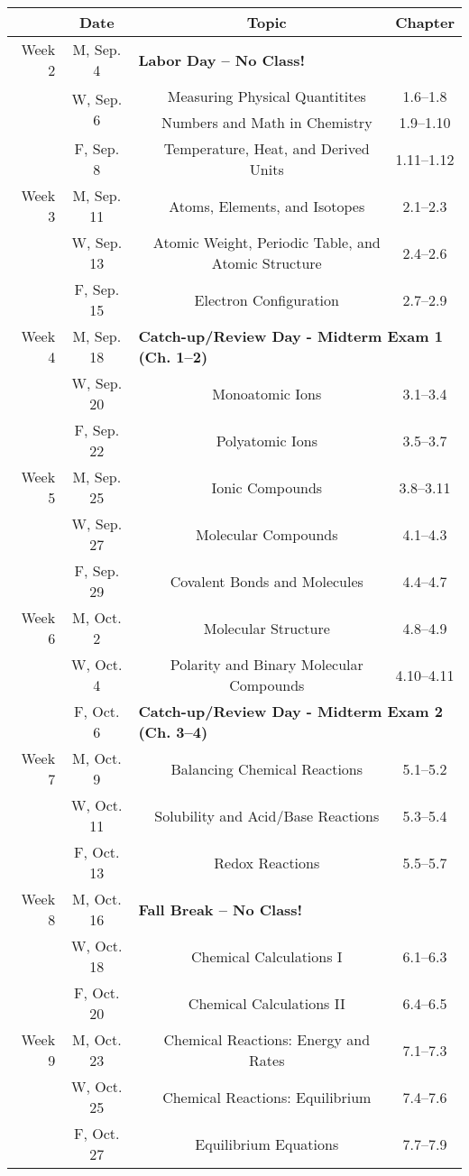 \documentclass[12pt, letterpaper]{article}
\begin{document}
\noindent
\begin{tabular}{rcccc}
& Date && Topic & Chapter\\
\midrule
Week 2 & M, Sep. 4& \multicolumn{3}{l}{\textbf{Labor Day -- No Class!}}\\
& \multirow{2}{*}{W, Sep. 6}& & Measuring Physical Quantitites & 1.6--1.8\\
& & & Numbers and Math in Chemistry & 1.9--1.10\\
& F, Sep. 8&& Temperature, Heat, and Derived Units & 1.11--1.12\\
\midrule
Week 3 & M, Sep. 11&& Atoms, Elements, and Isotopes & 2.1--2.3\\
& W, Sep. 13&& Atomic Weight, Periodic Table, and Atomic Structure & 2.4--2.6\\
& F, Sep. 15&& Electron Configuration & 2.7--2.9\\
\midrule
Week 4 & M, Sep. 18& \multicolumn{3}{l}{\textbf{Catch-up/Review Day - Midterm Exam 1 (Ch. 1--2)}}\\
& W, Sep. 20&& Monoatomic Ions & 3.1--3.4\\
& F, Sep. 22&& Polyatomic Ions & 3.5--3.7\\
\midrule
Week 5 & M, Sep. 25&& Ionic Compounds & 3.8--3.11\\
& W, Sep. 27&& Molecular Compounds & 4.1--4.3\\
& F, Sep. 29&& Covalent Bonds and Molecules & 4.4--4.7\\
\midrule
Week 6 & M, Oct. 2&& Molecular Structure & 4.8--4.9\\
& W, Oct. 4&& Polarity and Binary Molecular Compounds & 4.10--4.11\\
& F, Oct. 6& \multicolumn{3}{l}{\textbf{Catch-up/Review Day - Midterm Exam 2 (Ch. 3--4)}}\\
\midrule
Week 7 & M, Oct. 9&& Balancing Chemical Reactions & 5.1--5.2\\
& W, Oct. 11&& Solubility and Acid/Base Reactions & 5.3--5.4\\
& F, Oct. 13&& Redox Reactions & 5.5--5.7\\
\midrule
Week 8 & M, Oct. 16& \multicolumn{3}{l}{\textbf{Fall Break -- No Class!}}\\
& W, Oct. 18&& Chemical Calculations I & 6.1--6.3\\
& F, Oct. 20&& Chemical Calculations II & 6.4--6.5\\
\midrule
Week 9 & M, Oct. 23&& Chemical Reactions: Energy and Rates & 7.1--7.3\\
& W, Oct. 25&& Chemical Reactions: Equilibrium & 7.4--7.6\\
& F, Oct. 27&& Equilibrium Equations & 7.7--7.9\\
\end{tabular}
\end{document}
